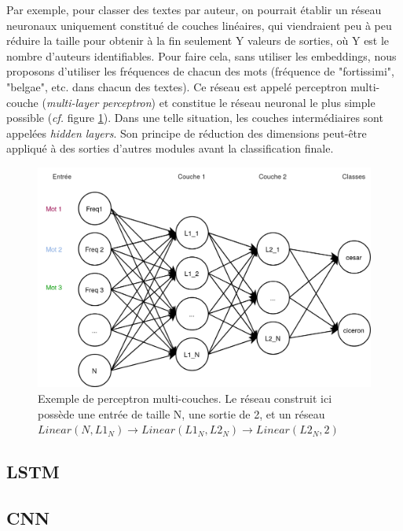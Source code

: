 Par exemple, pour classer des textes par auteur, on pourrait établir un réseau neuronaux uniquement constitué de couches linéaires, qui viendraient peu à peu réduire la taille pour obtenir à la fin seulement Y valeurs de sorties, où Y est le nombre d'auteurs identifiables. Pour faire cela, sans utiliser les embeddings, nous proposons d'utiliser les fréquences de chacun des mots (fréquence de "fortissimi", "belgae", etc. dans chacun des textes). Ce réseau est appelé perceptron multi-couche (\textit{multi-layer perceptron}) et constitue le réseau neuronal le plus simple possible (\textit{cf.} figure \ref{deep-learning:mlp}). Dans une telle situation, les couches intermédiaires sont appelées \textit{hidden layers}.  Son principe de réduction des dimensions peut-être appliqué à des sorties d'autres modules avant la classification finale.

\begin{figure}
    \centering
    \includegraphics[width=\linewidth]{results/deep-learning/explanations/MLP.png}
    \caption{Exemple de perceptron multi-couches. Le réseau construit ici possède une entrée de taille N, une sortie de 2, et un réseau $Linear(N, L1_N) \rightarrow Linear(L1_N, L2_N) \rightarrow Linear(L2_N, 2)$}
    \label{deep-learning:mlp}
\end{figure}

\subsection{LSTM}

\subsection{CNN}